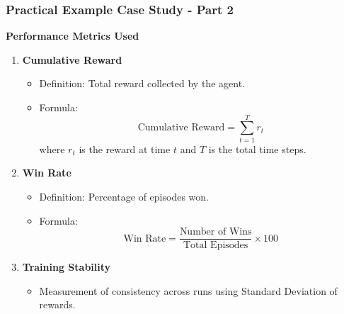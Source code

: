 \documentclass{beamer}
\begin{document}
\begin{frame}[fragile]
    \frametitle{Practical Example Case Study - Part 2}
    \textbf{Performance Metrics Used}
    
    \begin{enumerate}
        \item \textbf{Cumulative Reward}
        \begin{itemize}
            \item Definition: Total reward collected by the agent.
            \item Formula: 
            \[
            \text{Cumulative Reward} = \sum_{t=1}^{T} r_t
            \]
            where \( r_t \) is the reward at time \( t \) and \( T \) is the total time steps.
        \end{itemize}
        
        \item \textbf{Win Rate}
        \begin{itemize}
            \item Definition: Percentage of episodes won.
            \item Formula: 
            \[
            \text{Win Rate} = \frac{\text{Number of Wins}}{\text{Total Episodes}} \times 100
            \]
        \end{itemize}
        
        \item \textbf{Training Stability}
        \begin{itemize}
            \item Measurement of consistency across runs using Standard Deviation of rewards.
        \end{itemize}
    \end{enumerate}
\end{frame}
\end{document}
